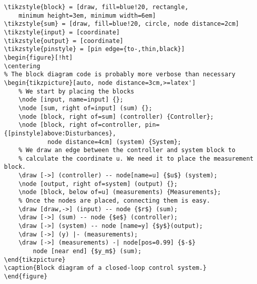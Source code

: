\begin{verbatim}
\tikzstyle{block} = [draw, fill=blue!20, rectangle, 
    minimum height=3em, minimum width=6em]
\tikzstyle{sum} = [draw, fill=blue!20, circle, node distance=2cm]
\tikzstyle{input} = [coordinate]
\tikzstyle{output} = [coordinate]
\tikzstyle{pinstyle} = [pin edge={to-,thin,black}]
\begin{figure}[!ht]
\centering
% The block diagram code is probably more verbose than necessary
\begin{tikzpicture}[auto, node distance=3cm,>=latex']
    % We start by placing the blocks
    \node [input, name=input] {};
    \node [sum, right of=input] (sum) {};
    \node [block, right of=sum] (controller) {Controller};
    \node [block, right of=controller, pin={[pinstyle]above:Disturbances},
            node distance=4cm] (system) {System};
    % We draw an edge between the controller and system block to 
    % calculate the coordinate u. We need it to place the measurement block. 
    \draw [->] (controller) -- node[name=u] {$u$} (system);
    \node [output, right of=system] (output) {};
    \node [block, below of=u] (measurements) {Measurements};
    % Once the nodes are placed, connecting them is easy. 
    \draw [draw,->] (input) -- node {$r$} (sum);
    \draw [->] (sum) -- node {$e$} (controller);
    \draw [->] (system) -- node [name=y] {$y$}(output);
    \draw [->] (y) |- (measurements);
    \draw [->] (measurements) -| node[pos=0.99] {$-$} 
        node [near end] {$y_m$} (sum);
\end{tikzpicture}
\caption{Block diagram of a closed-loop control system.}
\end{figure}
\end{verbatim}
